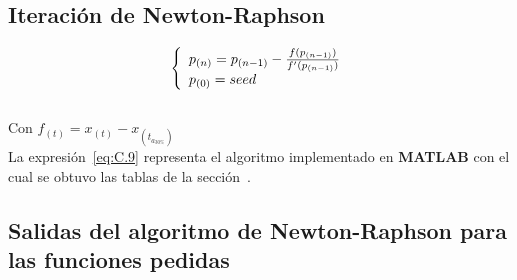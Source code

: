 \clearpage

\subsection{Iteración de Newton-Raphson}

\begin{equation}\label{eq:C.9}
\left\{ \begin{array}{l}
{\rm{ }}{p_{(n)}} = p_{(n - 1)} - \frac{f(p_{(n - 1)})}{f'(p_{(n - 1)})}\\
{p_{(0)}} = seed
\end{array} \right.
\end{equation}\\

Con $f_{(t)} = x_{(t)} - x_{\left(t_{a_{30\%}} \right)}$\\

La expresión~\eqref{eq:C.9} representa el algoritmo implementado en \textbf{MATLAB} con el cual se obtuvo las tablas de la sección~.




\subsection{Salidas del algoritmo de Newton-Raphson para las funciones pedidas}

\label{section:sect_nr_outputs}

